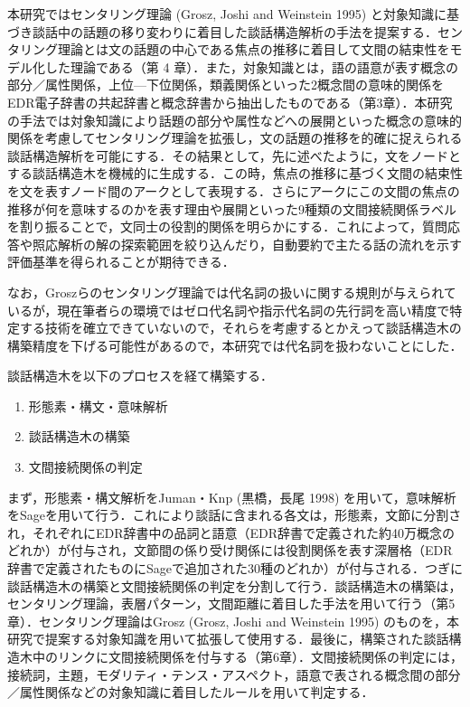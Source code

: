 \documentclass[japanese]{jnlp_1.4}
\begin{document}
本研究ではセンタリング理論 (Grosz, Joshi and Weinstein 1995) と対象知識に基づき談話中の話題の移り変わりに着目した談話構造解析の手法を提案する．センタリング理論とは文の話題の中心である焦点の推移に着目して文間の結束性をモデル化した理論である（第 4 章）．また，対象知識とは，語の語意が表す概念の部分／属性関係，上位—下位関係，類義関係といった2概念間の意味的関係をEDR電子辞書の共起辞書と概念辞書から抽出したものである（第3章）．本研究の手法では対象知識により話題の部分や属性などへの展開といった概念の意味的関係を考慮してセンタリング理論を拡張し，文の話題の推移を的確に捉えられる談話構造解析を可能にする．その結果として，先に述べたように，文をノードとする談話構造木を機械的に生成する．この時，焦点の推移に基づく文間の結束性を文を表すノード間のアークとして表現する．さらにアークにこの文間の焦点の推移が何を意味するのかを表す理由や展開といった9種類の文間接続関係ラベルを割り振ることで，文同士の役割的関係を明らかにする．これによって，質問応答や照応解析の解の探索範囲を絞り込んだり，自動要約で主たる話の流れを示す評価基準を得られることが期待できる．

なお，Groszらのセンタリング理論では代名詞の扱いに関する規則が与えられているが，現在筆者らの環境ではゼロ代名詞や指示代名詞の先行詞を高い精度で特定する技術を確立できていないので，それらを考慮するとかえって談話構造木の構築精度を下げる可能性があるので，本研究では代名詞を扱わないことにした．

談話構造木を以下のプロセスを経て構築する．

\begin{enumerate}
\item 形態素・構文・意味解析
\item 談話構造木の構築
\item 文間接続関係の判定
\end{enumerate}

まず，形態素・構文解析をJuman・Knp (黒橋，長尾 1998) を用いて，意味解析をSageを用いて行う．これにより談話に含まれる各文は，形態素，文節に分割され，それぞれにEDR辞書中の品詞と語意（EDR辞書で定義された約40万概念のどれか）が付与され，文節間の係り受け関係には役割関係を表す深層格（EDR辞書で定義されたものにSageで追加された30種のどれか）が付与される．つぎに談話構造木の構築と文間接続関係の判定を分割して行う．談話構造木の構築は，センタリング理論，表層パターン，文間距離に着目した手法を用いて行う（第5章）．センタリング理論はGrosz (Grosz, Joshi and Weinstein 1995) のものを，本研究で提案する対象知識を用いて拡張して使用する．最後に，構築された談話構造木中のリンクに文間接続関係を付与する（第6章）．文間接続関係の判定には，接続詞，主題，モダリティ・テンス・アスペクト，語意で表される概念間の部分／属性関係などの対象知識に着目したルールを用いて判定する．
\end{document}

